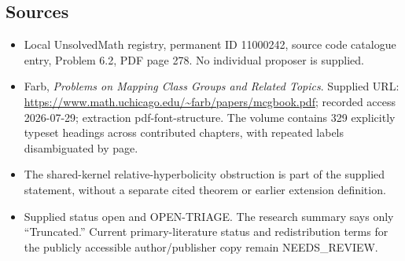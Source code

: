 \documentclass[11pt]{article}
\begin{document}
\subsection{Sources}
\begin{itemize}
\item Local UnsolvedMath registry, permanent ID 11000242, source code catalogue entry, Problem 6.2, PDF page 278. No individual proposer is supplied.
\item Farb, \emph{Problems on Mapping Class Groups and Related Topics}. Supplied URL: \url{https://www.math.uchicago.edu/~farb/papers/mcgbook.pdf}; recorded access 2026-07-29; extraction pdf-font-structure. The volume contains 329 explicitly typeset headings across contributed chapters, with repeated labels disambiguated by page.
\item The shared-kernel relative-hyperbolicity obstruction is part of the supplied statement, without a separate cited theorem or earlier extension definition.
\item Supplied status open and OPEN-TRIAGE. The research summary says only ``Truncated.'' Current primary-literature status and redistribution terms for the publicly accessible author/publisher copy remain NEEDS\_REVIEW.
\end{itemize}
\end{document}
